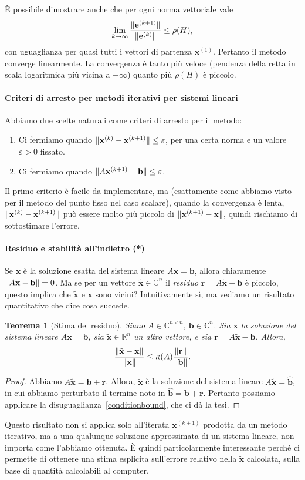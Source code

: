 \documentclass[a4paper]{report}
\DeclarePairedDelimiter{\norm}{\lVert}{\rVert}
\newtheorem{theorem}{Teorema}[chapter]
\theoremstyle{definiton}
\theoremstyle{remark}
\newcommand{\x}{\mathbf{x}}
\newcommand{\e}{\mathbf{e}}
\renewcommand{\b}{\mathbf{b}}
\begin{document}
È possibile dimostrare anche che per ogni norma vettoriale vale
\[
\lim_{k\to\infty} \frac{\norm{\e^{(k+1)}}}{\norm{\e^{(k)}}} \leq \rho(H),
\]
con uguaglianza per quasi tutti i vettori di partenza $\x^{(1)}$. Pertanto il metodo converge linearmente. La convergenza è tanto più veloce (pendenza della retta in scala logaritmica più vicina a $-\infty$) quanto più $\rho(H)$ è piccolo.

\paragraph{Criteri di arresto per metodi iterativi per sistemi lineari}
Abbiamo due scelte naturali come criteri di arresto per il metodo:
\begin{enumerate}
    \item Ci fermiamo quando $\norm{\x^{(k)} - \x^{(k+1)}} \leq \varepsilon$, per una certa norma e un valore $\varepsilon > 0$ fissato.
    \item Ci fermiamo quando $\norm{A \x^{(k+1)} - \b} \leq \varepsilon$.
\end{enumerate}
Il primo criterio è facile da implementare, ma (esattamente come abbiamo visto per il metodo del punto fisso nel caso scalare), quando la convergenza è lenta, $\norm{\x^{(k)} - \x^{(k+1)}}$ può essere molto più piccolo di $\norm{\x^{(k+1)} - \x}$, quindi rischiamo di sottostimare l'errore.

\paragraph{Residuo e stabilità all'indietro (*)}  Se $\x$ è la soluzione esatta del sistema lineare $A\x = \b$, allora chiaramente $\norm{A\x-\b} = 0$. Ma se per un vettore $\tilde{\x} \in \mathbb{C}^n$ il \emph{residuo} $\mathbf{r} = A\tilde{\x}-\b$ è piccolo, questo implica che $\tilde{\x}$ e $\x$ sono vicini? Intuitivamente sì, ma vediamo un risultato quantitativo che dice cosa succede.

\begin{theorem}[Stima del residuo]
Siano $A \in \mathbb{C}^{n\times n}$, $\b\in\mathbb{C}^n$. Sia $\x$ la soluzione del sistema lineare $A\x=\b$, sia $\tilde{\x}\in\mathbb{R}^n$ un altro vettore, e sia $\mathbf{r} = A\tilde{\x}-\b$. Allora,
\[
\frac{\norm{\tilde{\x}-\x}}{\norm{\x}} \leq \kappa(A) \frac{\norm{\mathbf{r}}}{\norm{\b}}.
\]
\end{theorem}
\begin{proof}
Abbiamo $A\tilde{\x} = \b + \mathbf{r}$. Allora, $\tilde{\x}$ è la soluzione del sistema lineare $A\tilde{\x} = \widehat{\b}$, in cui abbiamo perturbato il termine noto in $\widehat{\b} = \b + \mathbf{r}$. Pertanto possiamo applicare la disuguaglianza~\eqref{conditionbound}, che ci dà la tesi.
\end{proof}
Questo risultato non si applica solo all'iterata $\x^{(k+1)}$ prodotta da un metodo iterativo, ma a una qualunque soluzione approssimata di un sistema lineare, non importa come l'abbiamo ottenuta. È quindi particolarmente interessante perché ci permette di ottenere una stima esplicita sull'errore relativo nella $\tilde{\x}$ calcolata, sulla base di quantità calcolabili al computer.
\end{document}

